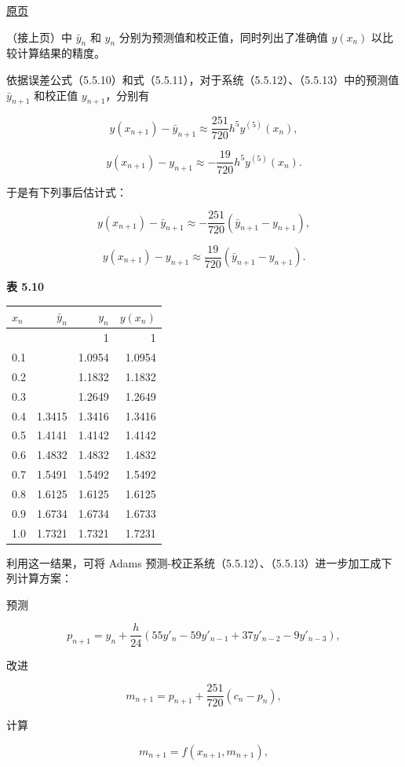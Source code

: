 \documentclass[
  10pt,
  fontset=fandol]{ctexart}
\newcounter{none} %
\begin{document}
\href{../../source-images/pdf-141.jpeg}{原页}

（接上页）中 \(\bar y_n\) 和 \(y_n\) 分别为预测值和校正值，同时列出了准确值 \(y(x_n)\) 以比较计算结果的精度。

依据误差公式（5.5.10）和式（5.5.11），对于系统（5.5.12）、（5.5.13）中的预测值 \(\bar y_{n+1}\) 和校正值 \(y_{n+1}\)，分别有

\[
y(x_{n+1})-\bar y_{n+1}\approx\frac{251}{720}h^5y^{(5)}(x_n),
\]

\[
y(x_{n+1})-y_{n+1}\approx-\frac{19}{720}h^5y^{(5)}(x_n).
\]

于是有下列事后估计式：

\[
y(x_{n+1})-\bar y_{n+1}\approx-\frac{251}{720}(\bar y_{n+1}-y_{n+1}),
\]

\[
y(x_{n+1})-y_{n+1}\approx\frac{19}{720}(\bar y_{n+1}-y_{n+1}).
\]

\textbf{表 5.10}

{\def\LTcaptype{none} %
\begin{longtable}[]{@{}lrrr@{}}
\toprule\noalign{}
\(x_n\) & \(\bar y_n\) & \(y_n\) & \(y(x_n)\) \\
\midrule\noalign{}
\endhead
\bottomrule\noalign{}
\endlastfoot
0 & & 1 & 1 \\
0.1 & & 1.0954 & 1.0954 \\
0.2 & & 1.1832 & 1.1832 \\
0.3 & & 1.2649 & 1.2649 \\
0.4 & 1.3415 & 1.3416 & 1.3416 \\
0.5 & 1.4141 & 1.4142 & 1.4142 \\
0.6 & 1.4832 & 1.4832 & 1.4832 \\
0.7 & 1.5491 & 1.5492 & 1.5492 \\
0.8 & 1.6125 & 1.6125 & 1.6125 \\
0.9 & 1.6734 & 1.6734 & 1.6733 \\
1.0 & 1.7321 & 1.7321 & 1.7231 \\
\end{longtable}
}

利用这一结果，可将 Adams 预测-校正系统（5.5.12）、（5.5.13）进一步加工成下列计算方案：

预测

\[
p_{n+1}=y_n+\frac h{24}(55y'_n-59y'_{n-1}+37y'_{n-2}-9y'_{n-3}),
\]

改进

\[
m_{n+1}=p_{n+1}+\frac{251}{720}(c_n-p_n),
\]

计算

\[
m_{n+1}=f(x_{n+1},m_{n+1}),
\]
\end{document}
